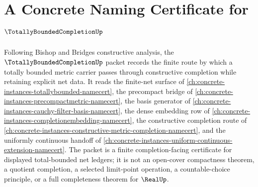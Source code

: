 \chapter{A Concrete Naming Certificate for $\TotallyBoundedCompletionUp$}
\label{ch:concrete-instances-totallyboundedcompletion-namecert}

Following Bishop and Bridges constructive analysis, the $\TotallyBoundedCompletionUp$ packet records the finite route by which a totally bounded metric carrier passes through constructive completion while retaining explicit net data. It reads the finite-net surface of \autoref{ch:concrete-instances-totallybounded-namecert}, the precompact bridge of \autoref{ch:concrete-instances-precompactmetric-namecert}, the basis generator of \autoref{ch:concrete-instances-cauchy-filter-basis-namecert}, the dense embedding row of \autoref{ch:concrete-instances-completionembedding-namecert}, the constructive completion route of \autoref{ch:concrete-instances-constructive-metric-completion-namecert}, and the uniformly continuous handoff of \autoref{ch:concrete-instances-uniform-continuous-extension-namecert}. The packet is a finite completion-facing certificate for displayed total-bounded net ledgers; it is not an open-cover compactness theorem, a quotient completion, a selected limit-point operation, a countable-choice principle, or a full completeness theorem for $\RealUp$.


